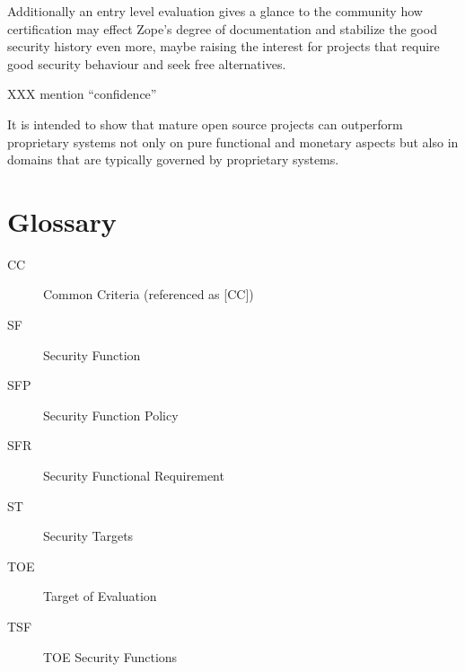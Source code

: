 \documentclass[12pt,english]{scrbook}
\begin{document}
Additionally an entry level evaluation gives a glance to the community how
certification may effect Zope's degree of documentation and stabilize the good
security history even more, maybe raising the interest for projects that
require good security behaviour and seek free alternatives.

XXX mention ``confidence''

It is intended to show that mature open source projects can outperform
proprietary systems not only on pure functional and monetary aspects but also
in domains that are typically governed by proprietary systems.





\chapter{Glossary}
\begin{description}
\item[CC]

Common Criteria (referenced as {[}CC])

\item[SF]

Security Function

\item[SFP]

Security Function Policy

\item[SFR]

Security Functional Requirement

\item[ST]

Security Targets

\item[TOE]

Target of Evaluation

\item[TSF]

TOE Security Functions

\end{description}
\end{document}
